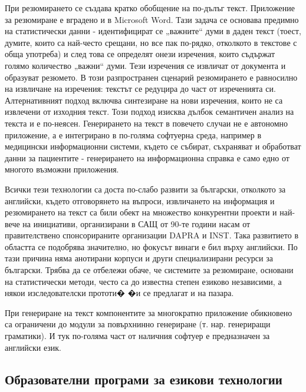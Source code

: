 \documentclass[]{../../metanetpaper}
\begin{document}
\begin{multicols}{2}
При резюмирането се създава кратко обобщение на по-дълъг текст. Приложение за резюмиране е вградено и в Microsoft Word. Тази задача се основава предимно на статистически данни - идентифицират се „важните“ думи в даден текст (тоест, думите, които са най-често срещани, но все
 пак по-рядко, отколкото в текстове с обща употреба) и
 след това се определят онези изречения, които съдържат
 голямо количество „важни“ думи. Тези изречения се извличат от документа и образуват резюмето. В този разпространен сценарий резюмирането е равносилно на извличане на изречения: текстът се редуцира до част от изреченията си.
 Алтернативният подход включва синтезиране на нови
 изречения, които не са извлечени от изходния текст. Този подход изисква дълбок семантичен анализ на текста и е по-неясен. Генерирането на текст в повечето случаи не е автономно приложение, а е интегрирано в по-голяма софтуерна среда, например в медицински информационни системи, където се събират, съхраняват и обработват данни за пациентите - генерирането на информационна справка е само едно от многото възможни приложения.
 
Всички тези технологии са доста по-слабо развити за български, отколкото за английски, където отговорянето на въпроси, извличането на информация
 и резюмирането на текст са били обект на множество конкурентни проекти и най-вече на инициативи, организирани в САЩ от 90-те години насам от правителствено спонсорираните организации DAPRA и INST. Така развитието в областта се подобрява значително, но фокусът винаги е бил върху английски. По тази причина няма анотирани корпуси и други специализирани ресурси за български. Трябва да се отбележи обаче, че системите за резюмиране, основани на статистически методи, често са до известна степен езиково независими, а някои изследователски прототи�
 �и се предлагат и на пазара.

При генериране на текст компонентите за многократно приложение обикновено са
 ограничени до модули за повърхнинно генериране (т. нар. генериращи граматики). И тук по-голяма част от наличния софтуер е предназначен за английски език.

\subsection{Образователни програми за езикови технологии}


\end{multicols}
\end{document}
